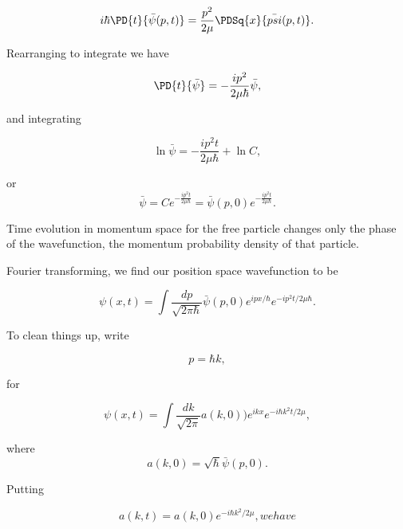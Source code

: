 \begin{equation}\label{eqn:qmTwoL21:n}
i \hbar \PD{t}{\bar{\psi}(p,t)} = \frac{p^2}{2 \mu} \PDSq{x}{\bar{psi}(p, t)}.
\end{equation}

Rearranging to integrate we have

\begin{equation}\label{eqn:qmTwoL21:n}
\PD{t}{\bar{\psi}} = -\frac{i p^2}{2 \mu \hbar} \bar{\psi},
\end{equation}

and integrating

\begin{equation}\label{eqn:qmTwoL21:n}
\ln \bar{\psi} = -\frac{i p^2 t}{2 \mu \hbar} + \ln C,
\end{equation}

or 
\begin{equation}\label{eqn:qmTwoL21:n}
\bar{\psi} = C e^{-\frac{i p^2 t}{2 \mu \hbar}} = \bar{\psi}(p, 0) e^{-\frac{i p^2 t}{2 \mu \hbar}}.
\end{equation}

Time evolution in momentum space for the free particle changes only the phase of the wavefunction, the momentum probability density of that particle.

Fourier transforming, we find our position space wavefunction to be

\begin{equation}\label{eqn:qmTwoL21:n}
\psi(x, t) = \int \frac{dp}{\sqrt{2 \pi \hbar}} \bar{\psi}(p, 0) e^{i p x/\hbar} e^{-i p^2 t/2 \mu \hbar}.
\end{equation}

To clean things up, write

\begin{equation}\label{eqn:qmTwoL21:n}
p = \hbar k,
\end{equation}

for

\begin{equation}\label{eqn:qmTwoL21:n}
\psi(x, t) = \int \frac{dk}{\sqrt{2 \pi}} a(k, 0) ) e^{i k x} e^{-i \hbar k^2 t/2 \mu},
\end{equation}

where
\begin{equation}\label{eqn:qmTwoL21:n}
a(k, 0) = \sqrt{\hbar} \bar{\psi}(p, 0).
\end{equation}

Putting

\begin{equation}\label{eqn:qmTwoL21:n}
a(k, t) = a(k, 0) e^{ -i \hbar k^2/2 \mu}, we have
\end{equation}


